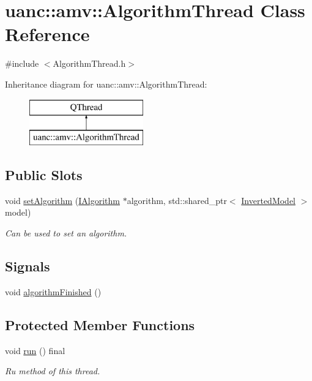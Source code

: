\hypertarget{classuanc_1_1amv_1_1_algorithm_thread}{}\section{uanc\+:\+:amv\+:\+:Algorithm\+Thread Class Reference}
\label{classuanc_1_1amv_1_1_algorithm_thread}


{\ttfamily \#include $<$Algorithm\+Thread.\+h$>$}

Inheritance diagram for uanc\+:\+:amv\+:\+:Algorithm\+Thread\+:\begin{figure}[H]
\begin{center}
\leavevmode
\includegraphics[height=2.000000cm]{classuanc_1_1amv_1_1_algorithm_thread}
\end{center}
\end{figure}
\subsection*{Public Slots}
\begin{DoxyCompactItemize}
\item 
void \hyperlink{classuanc_1_1amv_1_1_algorithm_thread_ac02242d01182f37d1fac4ef594cc4747}{set\+Algorithm} (\hyperlink{classuanc_1_1amv_1_1_i_algorithm}{I\+Algorithm} $\ast$algorithm, std\+::shared\+\_\+ptr$<$ \hyperlink{classuanc_1_1amv_1_1_inverted_model}{Inverted\+Model} $>$ model)
\begin{DoxyCompactList}\small\item\em Can be used to set an algorithm. \end{DoxyCompactList}\end{DoxyCompactItemize}
\subsection*{Signals}
\begin{DoxyCompactItemize}
\item 
void \hyperlink{classuanc_1_1amv_1_1_algorithm_thread_ae4f23094bff85708e4e155828c466112}{algorithm\+Finished} ()
\end{DoxyCompactItemize}
\subsection*{Protected Member Functions}
\begin{DoxyCompactItemize}
\item 
void \hyperlink{classuanc_1_1amv_1_1_algorithm_thread_ad1697895614bad2f2235b1bc9f02323f}{run} () final
\begin{DoxyCompactList}\small\item\em Ru method of this thread. \end{DoxyCompactList}\end{DoxyCompactItemize}



